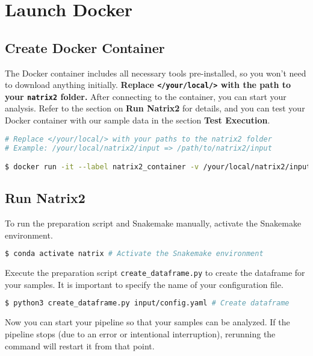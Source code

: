 \documentclass[a4paper,11pt]{article}
\newcommand{\vsp}{\vspace{0.2cm}}
\begin{document}
\newpage

\section{Launch Docker}
\subsection{Create Docker Container}
The Docker container includes all necessary tools pre-installed, so you won’t need to download anything initially. \textbf{Replace \texttt{</your/local/>} with the path to your \texttt{natrix2} folder.} After connecting to the container, you can start your analysis. Refer to the section on \textbf{Run Natrix2} for details, and you can test your Docker container with our sample data in the section \textbf{Test Execution}.

\begin{lstlisting}[language=bash]
# Replace </your/local/> with your paths to the natrix2 folder
# Example: /your/local/natrix2/input => /path/to/natrix2/input

$ docker run -it --label natrix2_container -v /your/local/natrix2/input:/app/input -v /your/local/natrix2/output:/app/output -v /your/local/natrix2/database:/app/database dbeisser/natrix2:latest bash
\end{lstlisting}

\noindent
\subsection{Run Natrix2}
\noindent
To run the preparation script and Snakemake manually, activate the Snakemake environment.

\begin{lstlisting}[language=bash]
$ conda activate natrix # Activate the Snakemake environment
\end{lstlisting}

\vsp
\noindent
Execute the preparation script \texttt{create\_dataframe.py} to create the dataframe for your samples. It is important to specify the name of your configuration file.

\begin{lstlisting}[language=bash]
$ python3 create_dataframe.py input/config.yaml # Create dataframe
\end{lstlisting}

\vsp
\noindent
Now you can start your pipeline so that your samples can be analyzed. If the pipeline stops (due to an error or intentional interruption), rerunning the command will restart it from that point.
\end{document}
